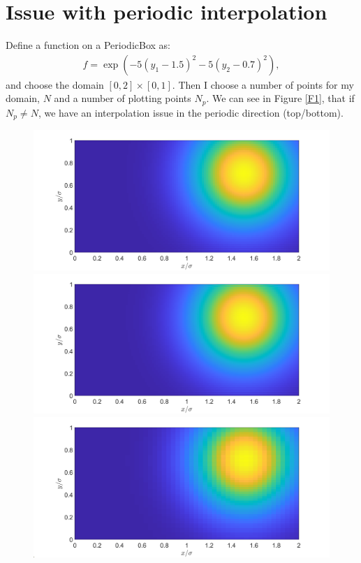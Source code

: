 \documentclass[11pt, a4paper]{article}
\theoremstyle{definition}
\begin{document}
\section{Issue with periodic interpolation}
	Define a function on a PeriodicBox as:
	\begin{align*}
		f = \exp(-5(y_1 - 1.5)^2 - 5(y_2 - 0.7)^2),
	\end{align*}	
	and choose the domain $[0,2]\times [0,1]$.
	Then I choose a number of points for my domain, $N$ and a number of plotting points $N_p$. We can see in Figure \ref{F1}, that if $N_p \neq N$, we have an interpolation issue in the periodic direction (top/bottom).
		\begin{figure}[h]
		\centering
		\includegraphics[scale=0.15]{N100a.png}
		\includegraphics[scale=0.15]{N100b.png}
		\includegraphics[scale=0.15]{N50a.png}

\end{figure}
\end{document}
